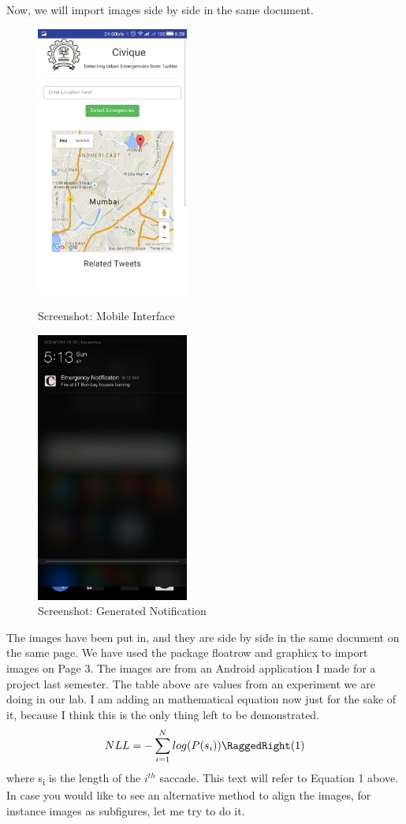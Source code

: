 \documentclass[11pt,a4paper]{article}
\begin{document}
\bigskip
\qquad Now, we will import images side by side in the same document.
\newpage
\begin{figure}
\parbox{5cm}{
\includegraphics[width=5cm]{and1.jpg}
\caption{Screenshot: Mobile Interface}
\label{fig:2figsA}}
\qquad
\begin{minipage}{5cm}
\includegraphics[width=5cm]{and2.jpg}   
\caption{Screenshot: Generated Notification}
\label{fig:2figsB}
\end{minipage}
\end{figure}
\bigbreak

\quad The images have been put in, and they are side by side in the same document on the same page. We have used the package floatrow and graphicx to import images on Page 3. The images are from an Android application I made for a project last semester. The table above are values from an experiment we are doing in our lab. I am adding an mathematical equation now just for the sake of it, because I think this is the only thing left to be demonstrated.
\newline
$$NLL = - \sum_{i=1}^{N} log(P(s_{i})) \RaggedRight (1)$$  
where s\textsubscript{i} is the length of the $i^{th}$ saccade.
\bigbreak
\quad This text will refer to Equation 1 above. In case you would like to
see an alternative method to align the images, for instance images as
subfigures, let me try to do it.
\newpage
\end{document}
